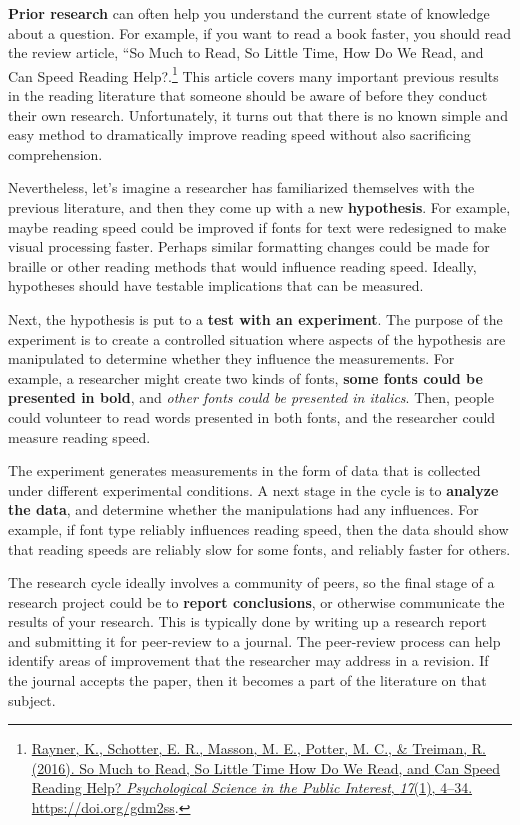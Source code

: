 \documentclass[
  oneside,
  12pt]{crumpbook}
\begin{document}
\textbf{Prior research} can often help you understand the current state of knowledge about a question. For example, if you want to read a book faster, you should read the review article, ``So Much to Read, So Little Time, How Do We Read, and Can Speed Reading Help?.\footnote{\protect\hyperlink{ref-raynerMuchReadLittle2016}{Rayner, K., Schotter, E. R., Masson, M. E., Potter, M. C., \& Treiman, R. (2016). So {Much} to {Read}, {So Little Time How Do We Read}, and {Can Speed Reading Help}? \emph{Psychological Science in the Public Interest}, \emph{17}(1), 4--34. \url{https://doi.org/gdm2ss}}.} This article covers many important previous results in the reading literature that someone should be aware of before they conduct their own research. Unfortunately, it turns out that there is no known simple and easy method to dramatically improve reading speed without also sacrificing comprehension.

Nevertheless, let's imagine a researcher has familiarized themselves with the previous literature, and then they come up with a new \textbf{hypothesis}. For example, maybe reading speed could be improved if fonts for text were redesigned to make visual processing faster. Perhaps similar formatting changes could be made for braille or other reading methods that would influence reading speed. Ideally, hypotheses should have testable implications that can be measured.

Next, the hypothesis is put to a \textbf{test with an experiment}. The purpose of the experiment is to create a controlled situation where aspects of the hypothesis are manipulated to determine whether they influence the measurements. For example, a researcher might create two kinds of fonts, \textbf{some fonts could be presented in bold}, and \emph{other fonts could be presented in italics}. Then, people could volunteer to read words presented in both fonts, and the researcher could measure reading speed.

The experiment generates measurements in the form of data that is collected under different experimental conditions. A next stage in the cycle is to \textbf{analyze the data}, and determine whether the manipulations had any influences. For example, if font type reliably influences reading speed, then the data should show that reading speeds are reliably slow for some fonts, and reliably faster for others.

The research cycle ideally involves a community of peers, so the final stage of a research project could be to \textbf{report conclusions}, or otherwise communicate the results of your research. This is typically done by writing up a research report and submitting it for peer-review to a journal. The peer-review process can help identify areas of improvement that the researcher may address in a revision. If the journal accepts the paper, then it becomes a part of the literature on that subject.
\end{document}

